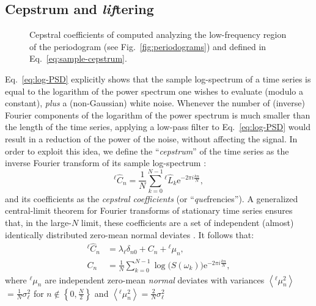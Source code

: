 \subsection{Cepstrum and \emph{lif}tering}

\begin{figure}[!tb]
    \centering
    \caption{Cepstral coefficients of  computed analyzing the low-frequency region of the periodogram (see Fig.~\ref{fig:periodograms}) and defined in Eq.~\eqref{eq:sample-cepstrum}. }
    \label{fig:cepstrums}
\end{figure}

Eq.~\eqref{eq:log-PSD} explicitly shows that the sample log-spectrum of a time series is equal to the logarithm of the power spectrum one wishes to evaluate (modulo a constant), \emph{plus} a (non-Gaussian) white noise. Whenever the number of (inverse) Fourier components of the logarithm of the power spectrum is much smaller than the length of the time series, applying a low-pass filter to Eq.~\eqref{eq:log-PSD} would result in a reduction of the power of the noise, without affecting the signal. 
In order to exploit this idea, we define the ``\emph{cepstrum}'' of the time series as the inverse Fourier transform of its sample log-spectrum \citep{Childers1977}:
\begin{equation}
  ^{\ell\!} \hat C_{n} = \frac{1}{N}\sum_{k=0}^{N-1} {^{\ell\!} \hat L_{k}} \mathrm{e}^{-2\pi i\frac{kn}{N}}, \label{eq:sample-cepstrum}
\end{equation}
and its coefficients as the \emph{cepstral coefficients} (or ``\emph{que}frencies''). 
A generalized central-limit theorem for Fourier transforms of stationary time series ensures that, in the large-$N$ limit, these coefficients are a set of independent (almost) identically distributed zero-mean normal deviates \citep{Anderson1994,Peligrad2010}. It follows that:
\begin{align}
    ^{\ell\!} \hat  C_{n} &= \lambda_{\ell} \delta_{n0} + C_{n} +  {^{{\ell\!}}{\mu}}_{n},  \label{eq:cepstrogram}\\
    C_{n} &= \frac{1}{N}\sum_{k=0}^{N-1} \log\bigl (S(\omega_k) \bigr ) \mathrm{e}^{-2\pi i\frac{kn}{N}}, \label{eq:C-nohat}
\end{align}
where $^{{\ell\!}}{\mu}_{n}$ are independent zero-mean \emph{normal} deviates with variances $\left\langle {^{{\ell\!}}{\mu}_{n}^2}  \right\rangle$ $=\frac{1}{N}\sigma_\ell^2$ for $n\notin\left\{ 0,\frac{N}{2}\right\}$ and $\left\langle ^{{\ell\!}}{\mu}_{n}^{2}\right\rangle =\frac{2}{N}\sigma_{\ell}^{2}$
